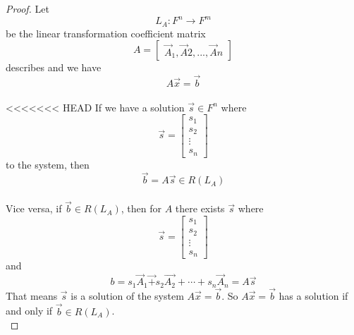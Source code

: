 \begin{homeworkProblem}
\solution

\begin{proof}
    Let \[L_A: F^{n} \rightarrow F^{m}\] be the linear transformation coefficient matrix \[
        A = \begin{bmatrix}\vec{A}_1, \vec{A}2,..., \vec{A}n\end{bmatrix} \]
    describes and we have \[
        A\vec{x} = \vec{b}
    \]\\

<<<<<<< HEAD
    If we have a solution $\vec{s} \in F^n$ where \[
    \vec{s} = \begin{bmatrix}
        s_1 \\ s_2 \\ \vdots \\ s_n
    \end{bmatrix}
    \]  to the system,
    then \[
    \vec{b} = A\vec{s} \in R(L_A)
    \]\\
    Vice versa, if $\vec{b} \in R(L_A)$, then for $A$ there exists $\vec{s}$ where \[
        \vec{s} = \begin{bmatrix}
            s_1 \\ s_2 \\ \vdots \\ s_n
        \end{bmatrix}
        \] and \[
    b = s_1\vec{A}_1\vec + s_2\vec{A_2} + \cdots + s_n\vec{A}_n =A\vec{s}
        \]
    That means $\vec{s}$ is a solution of the system $A\vec{x} = \vec{b}$. So $A\vec{x} = \vec{b}$ has a solution if and only if $\vec{b} \in R(L_A)$.\\


\end{proof}
\end{homeworkProblem}
